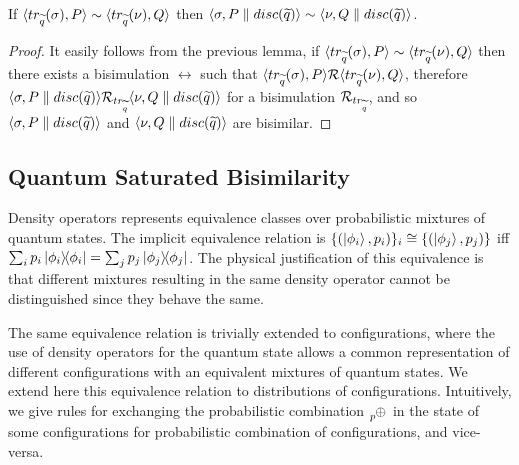 \begin{theorem}\label{bisim_closed_by_discard}
If $\langle tr_{\widetilde{q}}(\sigma), P\rangle \sim \langle tr_{\widetilde{q}}(\nu), Q\rangle$ then $\langle\sigma, P \parallel disc(\widetilde{q})\rangle \sim \langle\nu, Q \parallel disc(\widetilde{q})\rangle$.
\end{theorem}
\begin{proof}
It easily follows from the previous lemma, if $\langle tr_{\widetilde{q}}(\sigma), P\rangle \sim \langle tr_{\widetilde{q}}(\nu), Q\rangle$ then there exists a bisimulation $\rel$ such that $\langle tr_{\widetilde{q}}(\sigma), P\rangle \mathcal{R} \langle tr_{\widetilde{q}}(\nu), Q\rangle$, therefore $\langle\sigma, P \parallel disc(\widetilde{q})\rangle \mathcal{R}_{tr_{\widetilde{q}}} \langle\nu, Q \parallel disc(\widetilde{q})\rangle$ for a bisimulation $\mathcal{R}_{tr_{\widetilde{q}}}$, and so $\langle\sigma, P \parallel disc(\widetilde{q})\rangle$ and $\langle\nu, Q \parallel disc(\widetilde{q})\rangle$ are bisimilar.
\end{proof}


\subsection{Quantum Saturated Bisimilarity}

Density operators represents equivalence classes over probabilistic mixtures of quantum states.
The implicit equivalence relation is $\{(\ket{\phi_i}, p_i)\}_i \cong \{(\ket{\phi_j}, p_j)\}$ iff $\sum_{i} p_i \ket{\phi_i}\!\!\bra{\phi_i} = \sum_{j} p_j \ket{\phi_j}\!\!\bra{\phi_j}$.
The physical justification of this equivalence is that different mixtures resulting in the same density operator cannot be distinguished since they behave the same.

The same equivalence relation is trivially extended to configurations, where the use of density operators for the quantum state allows a common representation of different configurations with an equivalent mixtures of quantum states. 
We extend here this equivalence relation to distributions of configurations.
Intuitively, we give rules for exchanging the probabilistic combination $\psum{p}$ in the state of some configurations for probabilistic combination of configurations, and vice-versa. 

